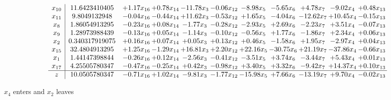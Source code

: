 \documentclass[9pt]{article}
\begin{document}
 \[\begin{array}{c| c c@{\hskip 2pt} c@{\hskip 2pt} c@{\hskip 2pt} c@{\hskip 2pt} c@{\hskip 2pt} c@{\hskip 2pt} c@{\hskip 2pt} c@{\hskip 2pt} c@{\hskip 2pt} }
 x_{10}   &  11.6423410405 & +  1.17 x_{16} & +  0.78 x_{14} & -11.78 x_{3} & -0.06 x_{12} & -8.98 x_{5} & -5.65 x_{6} & +  4.78 x_{7} & -9.02 x_{4} & +  0.48 x_{13}\\
 x_{11}   &  9.8049132948 & -0.04 x_{16} & -0.44 x_{14} & + 11.62 x_{3} & -0.53 x_{12} & +  1.65 x_{5} & -4.04 x_{6} & -12.62 x_{7} & + 10.45 x_{4} & -0.15 x_{13}\\
 x_{8}   &  1.86054913295 & -0.23 x_{16} & +  0.08 x_{14} & -1.77 x_{3} & -0.28 x_{12} & -2.93 x_{5} & +  2.69 x_{6} & -2.23 x_{7} & +  3.51 x_{4} & -0.07 x_{13}\\
 x_{9}   &  1.28973988439 & -0.13 x_{16} & +  0.05 x_{14} & -1.14 x_{3} & -0.10 x_{12} & -0.56 x_{5} & +  1.77 x_{6} & -1.86 x_{7} & +  2.34 x_{4} & +  0.06 x_{13}\\
 x_{2}   &  0.340317919075 & +  0.16 x_{16} & +  0.07 x_{14} & +  0.05 x_{3} & +  0.13 x_{12} & +  0.46 x_{5} & -1.58 x_{6} & +  1.95 x_{7} & -2.97 x_{4} & +  0.04 x_{13}\\
 x_{15}   &  32.4804913295 & +  1.25 x_{16} & -1.29 x_{14} & + 16.81 x_{3} & +  2.20 x_{12} & + 22.16 x_{5} & -30.75 x_{6} & + 21.19 x_{7} & -37.86 x_{4} & -0.66 x_{13}\\
 x_{1}   &  1.44147398844 & -0.26 x_{16} & +  0.12 x_{14} & -2.56 x_{3} & -0.41 x_{12} & -3.51 x_{5} & +  3.74 x_{6} & -3.44 x_{7} & +  5.43 x_{4} & +  0.01 x_{13}\\
 x_{17}   &  4.25505780347 & -0.47 x_{16} & -0.25 x_{14} & +  0.42 x_{3} & -0.98 x_{12} & +  3.40 x_{5} & +  3.32 x_{6} & -9.42 x_{7} & + 14.37 x_{4} & +  0.10 x_{13}\\
\hline
z    &  10.0505780347 & -0.71 x_{16} & +  1.02 x_{14} & -9.81 x_{3} & -1.77 x_{12} & -15.98 x_{5} & +  7.66 x_{6} & -13.19 x_{7} & +  9.70 x_{4} & -0.02 x_{13}\\
\end{array}\]


 $ x_{4} $ enters and $ x_{2} $ leaves 
\end{document}
